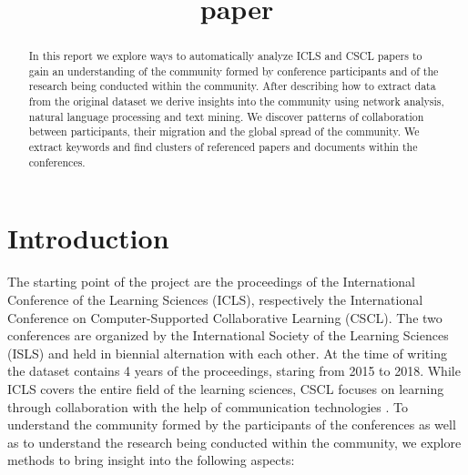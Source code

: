 \documentclass[journal,twocolumn]{IEEEtran}
\title{paper}
\begin{document}
    
    
    
\renewcommand{\figurename}{Figure}
\captionsetup{labelformat=simple}\title{   }
\author{
}
\maketitle

    
    

    

\begin{abstract}
    In this report we explore ways to automatically analyze ICLS and CSCL
papers to gain an understanding of the community formed by conference
participants and of the research being conducted within the community.
After describing how to extract data from the original dataset we derive
insights into the community using network analysis, natural language
processing and text mining. We discover patterns of collaboration
between participants, their migration and the global spread of the
community. We extract keywords and find clusters of referenced papers
and documents within the conferences.
\end{abstract}
    \hypertarget{introduction}{%
\section{Introduction}\label{introduction}}

The starting point of the project are the proceedings of the
International Conference of the Learning Sciences (ICLS), respectively
the International Conference on Computer-Supported Collaborative
Learning (CSCL). The two conferences are organized by the International
Society of the Learning Sciences (ISLS) and held in biennial alternation
with each other. At the time of writing the dataset contains 4 years of
the proceedings, staring from 2015 to 2018. While ICLS covers the entire
field of the learning sciences, CSCL focuses on learning through
collaboration with the help of communication technologies \cite{ICLS}.
To understand the community formed by the participants of the
conferences as well as to understand the research being conducted within
the community, we explore methods to bring insight into the following
aspects:
\end{document}
